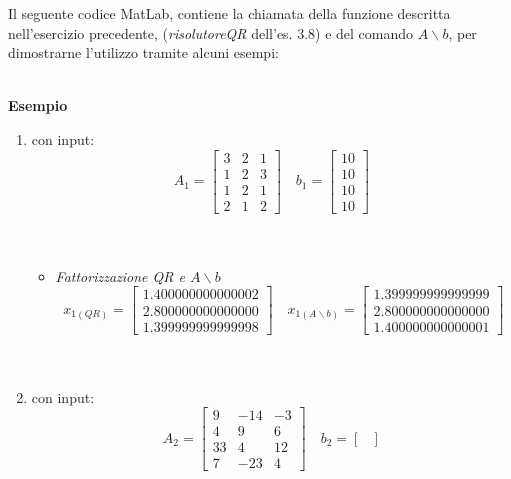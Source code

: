 Il seguente codice MatLab, contiene la chiamata della funzione descritta nell'esercizio precedente, (\textit{risolutoreQR}  dell'es. 3.8) e del comando $A \backslash b$, per dimostrarne l'utilizzo tramite alcuni esempi:\\\

\textbf{Esempio}
\begin{enumerate} 
	\item con input:
	      \[
	      	A_1 =\begin{bmatrix}
	      	3 & 2 & 1 \\
	      	1 & 2 & 3 \\
	      	1 & 2 & 1 \\
	      	2 & 1 & 2 
	      	\end{bmatrix} \quad
	      	b_1 =\begin{bmatrix}
	      	10 \\
	      	10 \\
	      	10 \\
	      	10
	      	\end{bmatrix}
	      \]\\\
	      \begin{itemize}
	      	\item \textit{Fattorizzazione QR e $A \backslash b$}
	      	      \[
	      	      	x_{1(QR)} =\begin{bmatrix}
	      	      	1.400000000000002 \\
	      	      	2.800000000000000 \\
	      	      	1.399999999999998
	      	      	\end{bmatrix} \quad
	      	      	x_{1(A \backslash b)} =\begin{bmatrix}
	      	      	1.399999999999999 \\
	      	      	2.800000000000000 \\
	      	      	1.400000000000001
	      	      	\end{bmatrix}
	      	      \]\\\	
	      \end{itemize}
	\item con input:
	      \[
	      	A_2 =\begin{bmatrix}
	      	9  & -14 & -3 \\
	      	4  & 9	 & 6  \\
	      	33 & 4   & 12 \\
	      	7  & -23 & 4 
	      	\end{bmatrix} \quad
	      	b_2 =\begin{bmatrix}

\end{bmatrix}\]
\end{enumerate}
